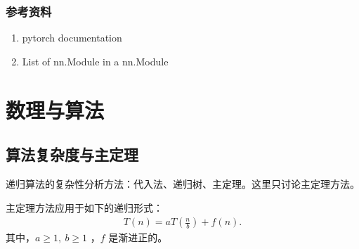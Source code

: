\documentclass[letterpaper,10pt,english]{sphinxmanual}
\begin{document}
\subsection{参考资料}
\label{\detokenize{deepLearning/09_addModule:id1}}\begin{enumerate}
\item {} 
pytorch documentation

\end{enumerate}
\begin{quote}

\end{quote}
\begin{enumerate}
\setcounter{enumi}{1}
\item {} 
List of nn.Module in a nn.Module

\end{enumerate}
\begin{quote}

\end{quote}


\chapter{数理与算法}
\label{\detokenize{mathematicsAlgorithm/index::doc}}\label{\detokenize{mathematicsAlgorithm/index:id1}}

\section{算法复杂度与主定理}
\label{\detokenize{mathematicsAlgorithm/01_complexity::doc}}\label{\detokenize{mathematicsAlgorithm/01_complexity:id1}}
递归算法的复杂性分析方法：代入法、递归树、主定理。这里只讨论主定理方法。

主定理方法应用于如下的递归形式：
\begin{equation*}
\begin{split}T(n) = aT(\frac{n}{b}) + f(n).\end{split}
\end{equation*}
其中，\(a \geqslant 1,\ b\geqslant 1\) ，\(f\) 是渐进正的。
\end{document}
